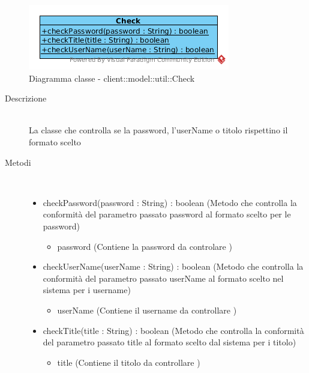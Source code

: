 \begin{center}
			\begin{figure}[H]
				\centering \includegraphics[scale=4, max width=\textwidth, max height=\myheight]{../img/diagrammiClassi/client/model/util/Check.png}
				\caption{Diagramma classe - client::model::util::Check}
			\end{figure}
		\end{center}\begin{description}
\item[Descrizione] \hfill \\
 La classe che controlla se la password,  l'userName o titolo rispettino il formato scelto
\item[Metodi] \hfill \\
 \vspace{-7mm}
\begin{itemize}
\item checkPassword(password : String) : boolean (Metodo che controlla la conformità del parametro passato password al formato scelto per le password)\begin{itemize}
\item password (Contiene la password da controlare  )
\end{itemize}

\item checkUserName(userName : String) : boolean (Metodo che controlla la conformità del parametro passato userName al formato scelto nel sistema per i username)\begin{itemize}
\item userName (Contiene il username da controllare )
\end{itemize}

\item checkTitle(title : String) : boolean (Metodo che controlla la conformità del parametro passato title al formato scelto dal sistema per i titolo)\begin{itemize}
\item title (Contiene il titolo da controllare )
\end{itemize}

\end{itemize}

\end{description}

